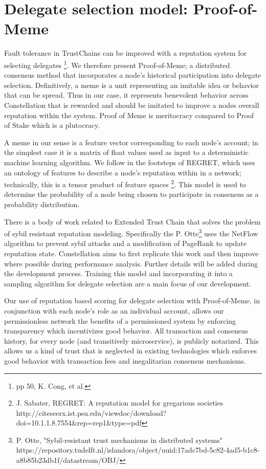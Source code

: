 \documentclass{article}
\begin{document}
\section{Delegate selection model: Proof-of-Meme}
Fault tolerance in TrustChains can be improved with a reputation system for selecting delegates \footnote{pp 50, K. Cong, et al.}. We therefore present Proof-of-Meme; a distributed consensus method that incorporates a node's historical participation into delegate selection. Definitively, a meme is a unit representing an imitable idea or behavior that can be spread. Thus in our case, it represents benevolent behavior across Constellation that is rewarded and should be imitated to improve a nodes overall reputation within the system. Proof of Meme is meritocracy compared to Proof of Stake which is a plutocracy.

A meme in our sense is a feature vector corresponding to each node's account; in the simplest case it is a matrix of float values used as input to a deterministic machine learning algorithm. We follow in the footsteps of REGRET, which uses an ontology of features to describe a node's reputation within in a network; technically, this is a tensor product of feature spaces \footnote{J. Sabater, REGRET: A reputation model for gregarious societies http://citeseerx.ist.psu.edu/viewdoc/download?doi=10.1.1.8.7554&rep=rep1&type=pdf}. This model is used to determine the probability of a node being chosen to participate in consensus as a probability distribution. 

There is a body of work related to Extended Trust Chain that solves the problem of sybil resistant reputation modeling. Specifically the P. Otte\footnote{P. Otte, "Sybil-resistant trust mechanisms in distributed systems" https://repository.tudelft.nl/islandora/object/uuid:17adc7bd-5c82-4ad5-b1c8-a8b85b23db1f/datastream/OBJ/} uses the NetFlow algorithm to prevent sybil attacks and a modification of PageRank to update reputation state. Constellation aims to first replicate this work and then improve where possible during performance analysis. Further details will be added during the development process. Training this model and incorporating it into a sampling algorithm for delegate selection are a main focus of our development.

Our use of reputation based scoring for delegate selection with Proof-of-Meme, in conjunction with each node's role as an individual account, allows our permissionless network the benefits of a permissioned system by enforcing transparency which incentivizes good behavior. All transaction and consensus history, for every node (and transitively microservice), is publicly notarized. This allows us a kind of trust that is neglected in existing technologies which enforces good behavior with transaction fees and inegalitarian consensus mechanisms.
\end{document}
